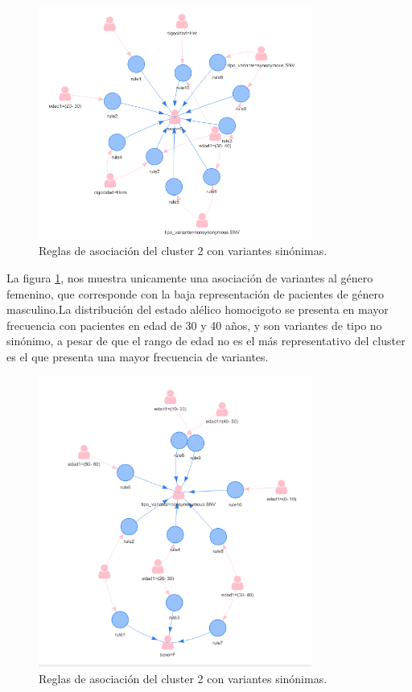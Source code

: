 \begin{figure}[H]
	\centering
	\includegraphics[width=0.8\textwidth]{Kap4/reglas2_1}
	\caption{Reglas de asociación del cluster 2 con variantes sinónimas.} \label{fig:reglas2_1}
\end{figure}

La figura \ref{fig:reglas2_1}, nos muestra unicamente una asociación de variantes al género femenino, que corresponde con la baja representación de pacientes de género  masculino.La distribución del estado alélico homocigoto se presenta en mayor frecuencia con pacientes en edad de 30 y 40 años, y son variantes de tipo no sinónimo, a pesar de que el rango de edad no es el más representativo del cluster es el que presenta una mayor frecuencia de variantes.
 
\begin{figure}[H]
	\centering
	\includegraphics[width=0.8\textwidth]{Kap4/reglas2_2}
	\caption{Reglas de asociación del cluster 2 con variantes sinónimas.} \label{fig:reglas2_2}
\end{figure}

